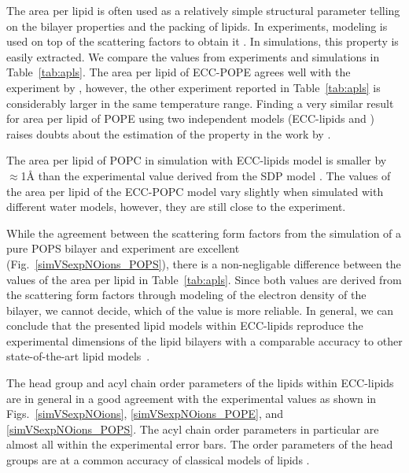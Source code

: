 The area per lipid is often used as a relatively simple structural parameter telling on the bilayer properties and the packing of lipids. 
In experiments, modeling is used on top of the scattering factors to obtain it \citep{SDP-CHARMM36_comparison_paper_Samuli-knows}. 
In simulations, this property is easily extracted. 
We compare the values from experiments and simulations in Table~\ref{tab:apls}. 
The area per lipid of ECC-POPE agrees well with the experiment by \citet{parsegian89}, 
however, the other experiment reported in Table~\ref{tab:apls} is considerably larger in the same temperature range. 
Finding a very similar result for area per lipid of POPE using two independent models (ECC-lipids and \citep{parsegian89})
raises doubts about the estimation of the property in the work by \citet{rappolt03}. 

The area per lipid of POPC in simulation with ECC-lipids model is smaller by $\approx$1Å 
than the experimental value derived from the SDP model \citep{SDP-CHARMM36_comparison_paper_Samuli-knows}. 
The values of the area per lipid of the ECC-POPC model vary slightly 
when simulated with different water models, however,
they are still close to the experiment. 

While the agreement between the scattering form factors 
from the simulation of a pure POPS bilayer and experiment 
are excellent (Fig.~\ref{simVSexpNOions_POPS}),
there is a non-negligable difference between the values of the area per lipid in Table~\ref{tab:apls}. 
Since both values are derived from the scattering form factors through modeling of the electron density of the bilayer,
we cannot decide, which of the value is more reliable. 
In general, we can conclude that the presented lipid models within ECC-lipids 
reproduce the experimental dimensions of the lipid bilayers 
with a comparable accuracy to other state-of-the-art lipid models~\citep{ollila16}. 
 
The head group and acyl chain order parameters of the lipids within ECC-lipids
are in general in a good agreement with the experimental values 
as shown in Figs.~\ref{simVSexpNOions}, \ref{simVSexpNOions_POPE},  and \ref{simVSexpNOions_POPS}. 
The acyl chain order parameters in particular are almost all within the experimental error bars.
The order parameters of the head groups are at a common accuracy of classical models of lipids \citep{botan15, catte16}. 

